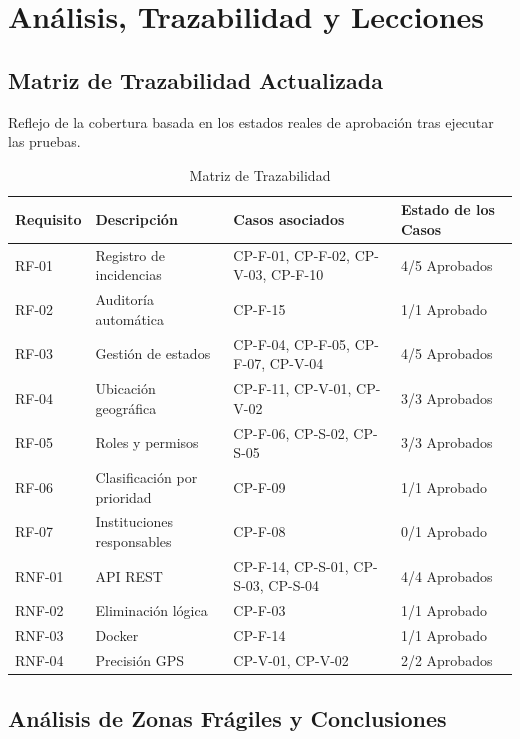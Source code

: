 \section{Análisis, Trazabilidad y Lecciones}
\label{sec:analisis_trazabilidad}

\subsection{Matriz de Trazabilidad Actualizada}

Reflejo de la cobertura basada en los estados reales de aprobación tras ejecutar las pruebas.

\begin{xltabular}{\textwidth}{l X l X}
    \caption{Matriz de Trazabilidad}
    \label{tab:matriz_trazabilidad} \\
    \toprule
    \textbf{Requisito} & \textbf{Descripción} & \textbf{Casos asociados} & \textbf{Estado de los Casos} \\
    \midrule
    RF-01 & Registro de incidencias & CP-F-01, CP-F-02, CP-V-03, CP-F-10 & 4/5 Aprobados \\
    RF-02 & Auditoría automática & CP-F-15 & 1/1 Aprobado \\
    RF-03 & Gestión de estados & CP-F-04, CP-F-05, CP-F-07, CP-V-04 & 4/5 Aprobados \\
    RF-04 & Ubicación geográfica & CP-F-11, CP-V-01, CP-V-02 & 3/3 Aprobados \\
    RF-05 & Roles y permisos & CP-F-06, CP-S-02, CP-S-05 & 3/3 Aprobados \\
    RF-06 & Clasificación por prioridad & CP-F-09 & 1/1 Aprobado \\
    RF-07 & Instituciones responsables & CP-F-08 & 0/1 Aprobado \\
    RNF-01 & API REST & CP-F-14, CP-S-01, CP-S-03, CP-S-04 & 4/4 Aprobados \\
    RNF-02 & Eliminación lógica & CP-F-03 & 1/1 Aprobado \\
    RNF-03 & Docker & CP-F-14 & 1/1 Aprobado \\
    RNF-04 & Precisión GPS & CP-V-01, CP-V-02 & 2/2 Aprobados \\
    \bottomrule
\end{xltabular}

\subsection{Análisis de Zonas Frágiles y Conclusiones}

